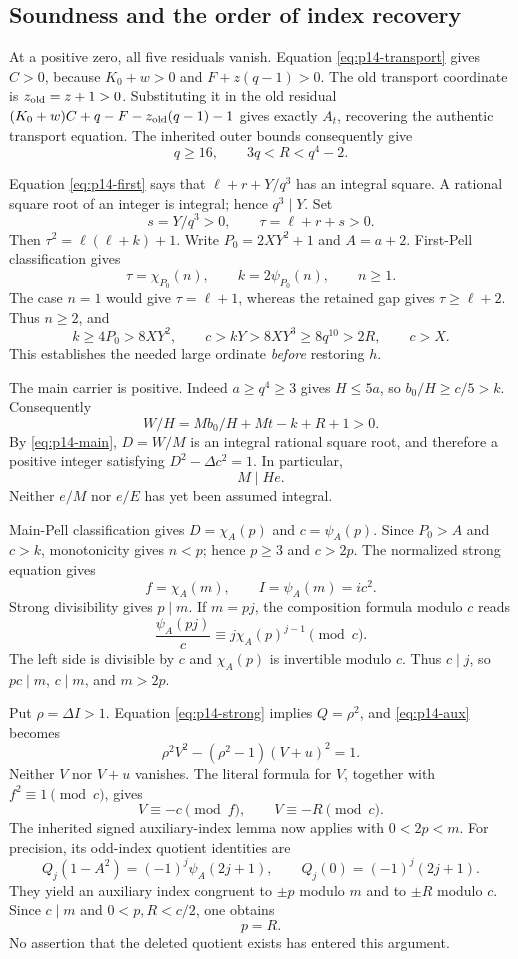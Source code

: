 \subsection{Soundness and the order of index recovery}

At a positive zero, all five residuals vanish. Equation
\eqref{eq:p14-transport} gives $C>0$, because $K_0+w>0$ and
$F+z(q-1)>0$. The old transport coordinate is $z_{\rm old}=z+1>0$.
Substituting it in the old residual
$(K_0+w)C+q-F-z_{\rm old}(q-1)-1$ gives exactly $A_t$,
recovering the authentic transport equation.
The inherited outer bounds consequently give
\[
 q\ge16,\qquad 3q<R<q^4-2.
\]

Equation \eqref{eq:p14-first} says that
$\ell+r+Y/q^3$ has an integral square. A rational square root of an integer
is integral; hence $q^3\mid Y$. Set
\[
 s=Y/q^3>0,\qquad \tau=\ell+r+s>0.
\]
Then $\tau^2=\ell(\ell+k)+1$. Write $P_0=2XY^2+1$ and $A=a+2$.
First-Pell classification gives
\[
 \tau=\chi_{P_0}(n),\qquad k=2\psi_{P_0}(n),\qquad n\ge1.
\]
The case $n=1$ would give $\tau=\ell+1$, whereas the retained gap gives
$\tau\ge\ell+2$. Thus $n\ge2$, and
\begin{equation}
 k\ge4P_0>8XY^2,\qquad
 c>kY>8XY^3\ge8q^{10}>2R,\qquad c>X.
 \label{eq:p14-earlybounds}
\end{equation}
This establishes the needed large ordinate \emph{before} restoring $h$.

The main carrier is positive. Indeed $a\ge q^4\ge3$ gives $H\le5a$,
so $b_0/H\ge c/5>k$. Consequently
\[
 W/H=Mb_0/H+Mt-k+R+1>0.
\]
By \eqref{eq:p14-main}, $D=W/M$ is an integral rational square root,
and therefore a positive integer satisfying $D^2-\Delta c^2=1$.
In particular,
\begin{equation}
 M\mid He.\label{eq:p14-divisibility}
\end{equation}
Neither $e/M$ nor $e/E$ has yet been assumed integral.

Main-Pell classification gives $D=\chi_A(p)$ and $c=\psi_A(p)$.
Since $P_0>A$ and $c>k$, monotonicity gives $n<p$; hence $p\ge3$
and $c>2p$. The normalized strong equation gives
\[
 f=\chi_A(m),\qquad I=\psi_A(m)=ic^2.
\]
Strong divisibility gives $p\mid m$. If $m=pj$, the composition formula
modulo $c$ reads
\[
 \frac{\psi_A(pj)}c\equiv j\chi_A(p)^{j-1}\pmod c.
\]
The left side is divisible by $c$ and $\chi_A(p)$ is invertible modulo $c$.
Thus $c\mid j$, so $pc\mid m$, $c\mid m$, and $m>2p$.

Put $\rho=\Delta I>1$. Equation \eqref{eq:p14-strong} implies
$Q=\rho^2$, and \eqref{eq:p14-aux} becomes
\[
 \rho^2V^2-(\rho^2-1)(V+u)^2=1.
\]
Neither $V$ nor $V+u$ vanishes. The literal formula for $V$, together with
$f^2\equiv1\pmod c$, gives
\[
 V\equiv-c\pmod f,\qquad V\equiv-R\pmod c.
\]
The inherited signed auxiliary-index lemma now applies with $0<2p<m$.
For precision, its odd-index quotient identities are
\[
 Q_j(1-A^2)=(-1)^j\psi_A(2j+1),\qquad
 Q_j(0)=(-1)^j(2j+1).
\]
They yield an auxiliary index congruent to $\pm p$ modulo $m$ and to
$\pm R$ modulo $c$. Since $c\mid m$ and $0<p,R<c/2$, one obtains
\begin{equation}
 p=R.\label{eq:p14-rank}
\end{equation}
No assertion that the deleted quotient exists has entered this argument.

